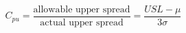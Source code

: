 

\[
C_{pu} = \frac{\mbox{allowable upper spread}} {\mbox{actual upper spread}} = \frac{USL - \mu} {3\sigma}
\]


